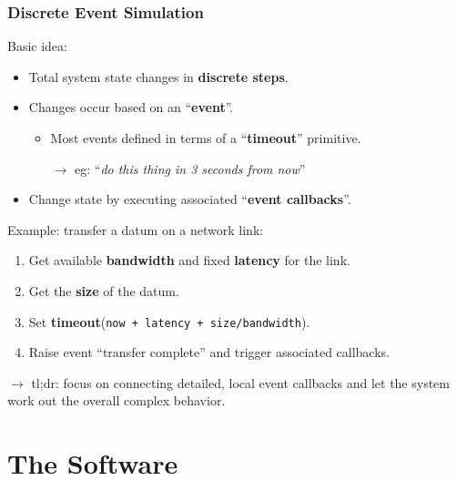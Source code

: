 \documentclass[xcolor=dvipsnames]{beamer}
\begin{document}
\begin{frame}
  \frametitle{Discrete Event Simulation}

  Basic idea:
  \begin{itemize}
  \item Total system state changes in \textbf{discrete steps}.
  \item Changes occur based on an ``\textbf{event}''. 
    \begin{itemize}
    \item Most events defined in terms of a ``\textbf{timeout}'' primitive.
    \item[$\rightarrow$] eg: ``\textit{do this thing in 3 seconds from now}''
    \end{itemize}
  \item Change state by executing associated ``\textbf{event callbacks}''.
  \end{itemize}

  \vspace{5mm}

  Example: transfer a datum on a network link:
  \begin{enumerate}\footnotesize
  \item Get available \textbf{bandwidth} and fixed \textbf{latency} for the link.
  \item Get the \textbf{size} of the datum.
  \item Set \textbf{timeout}(\texttt{now + latency + size/bandwidth}).
  \item Raise event ``transfer complete'' and trigger associated callbacks.
  \end{enumerate}

  \vspace{5mm}
  $\rightarrow$ tl;dr: focus on connecting detailed, local event callbacks
  and let the system work out the overall complex behavior.

\end{frame}

\section{The Software}

\begin{frame}
\end{frame}
\end{document}
